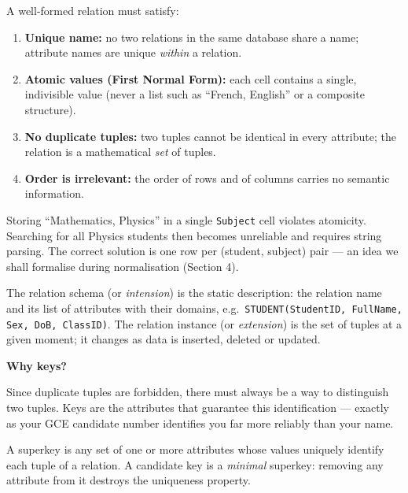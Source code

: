 \documentclass[11pt]{article}
\newcommand{\cle}[1]{{\popxbold\color{popdark}#1}}
\newcounter{popsec}
\newcounter{popsub}
\newcommand{\courssub}[1]{%
  \stepcounter{popsub}%
  \par\vspace{9pt}\noindent{\popxbold\fontsize{11.5}{13}\selectfont\color{popink}{\color{poporange}\thepopsec.\thepopsub}\hspace{6pt}#1}\par\nopagebreak\vspace{4pt}
}
\begin{document}
\begin{propriete}
A well-formed relation must satisfy:
\begin{enumerate}
\item \textbf{Unique name:} no two relations in the same database share a name; attribute names are unique \emph{within} a relation.
\item \textbf{Atomic values (First Normal Form):} each cell contains a single, indivisible value (never a list such as ``French, English'' or a composite structure).
\item \textbf{No duplicate tuples:} two tuples cannot be identical in every attribute; the relation is a mathematical \emph{set} of tuples.
\item \textbf{Order is irrelevant:} the order of rows and of columns carries no semantic information.
\end{enumerate}
\end{propriete}

\begin{attention}
Storing ``Mathematics, Physics'' in a single \texttt{Subject} cell violates atomicity. Searching for all Physics students then becomes unreliable and requires string parsing. The correct solution is one row per (student, subject) pair --- an idea we shall formalise during normalisation (Section 4).
\end{attention}

\begin{definition}
The \cle{relation schema} (or \emph{intension}) is the static description: the relation name and its list of attributes with their domains, e.g.\ \texttt{STUDENT(StudentID, FullName, Sex, DoB, ClassID)}. The \cle{relation instance} (or \emph{extension}) is the set of tuples at a given moment; it changes as data is inserted, deleted or updated.
\end{definition}

\courssub{Keys in the Relational Model}

\textbf{Why keys?}\par
Since duplicate tuples are forbidden, there must always be a way to distinguish two tuples. Keys are the attributes that guarantee this identification --- exactly as your GCE candidate number identifies you far more reliably than your name.

\begin{definition}
A \cle{superkey} is any set of one or more attributes whose values uniquely identify each tuple of a relation. A \cle{candidate key} is a \emph{minimal} superkey: removing any attribute from it destroys the uniqueness property.
\end{definition}
\end{document}
